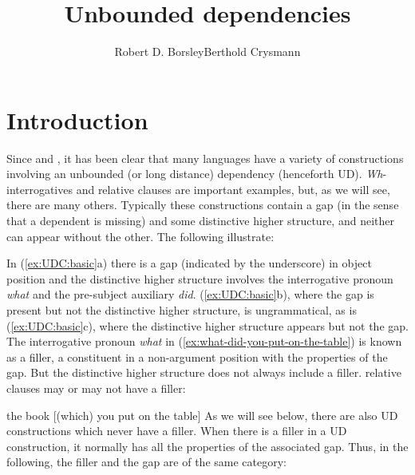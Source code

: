 \documentclass[output=paper,biblatex,babelshorthands,newtxmath,draftmode,colorlinks,citecolor=brown]{langscibook}
\author{Robert D. Borsley\affiliation{University of Essex and Bangor University}\lastand Berthold Crysmann\affiliation{Centre national de la recherche scientifique (CNRS)}}
\title{Unbounded dependencies}
\begin{document}
\maketitle
\label{chap-udc}



\section{Introduction}
\label{sec:Intro} 

Since \citet{ross_j67} and \citet{Chomsky:77}, it has been clear that many
languages have a variety of constructions involving an unbounded (or
long distance) dependency (henceforth UD). \emph{Wh}-interrogatives
and relative clauses are important examples, but, as we will see,
there are many others. Typically these constructions contain a gap
(in the sense that a dependent is missing) and some distinctive
higher structure, and neither can appear without the other. The
following illustrate:

\largerpage
\eal
\label{ex:UDC:basic}
\zl

\noindent In (\ref{ex:UDC:basic}a) there is a gap (indicated by the
underscore) in object position and the distinctive higher structure
involves the interrogative pronoun \emph{what} and the pre-subject
auxiliary \emph{did}. (\ref{ex:UDC:basic}b), where the gap is
present but not the distinctive higher structure, is ungrammatical,
as is (\ref{ex:UDC:basic}c), where the distinctive higher structure
appears but not the gap.  The interrogative pronoun \textit{what} in
(\ref{ex:what-did-you-put-on-the-table}) is known as a filler, a constituent in a
non-argument position with the properties of the gap.  But the
distinctive higher structure does not always include a filler.
 relative clauses may or may not have a filler:

\ea
\label{ex:UDC:2} 
the book [(which) you put \trace{} on the table]
\z 
\noindent As we will see below, there are also UD constructions which
never have a filler.  When there is a filler in a UD construction, it
normally has all the properties of the associated gap. Thus, in the
following, the filler and the gap are of the same category:
\end{document}
